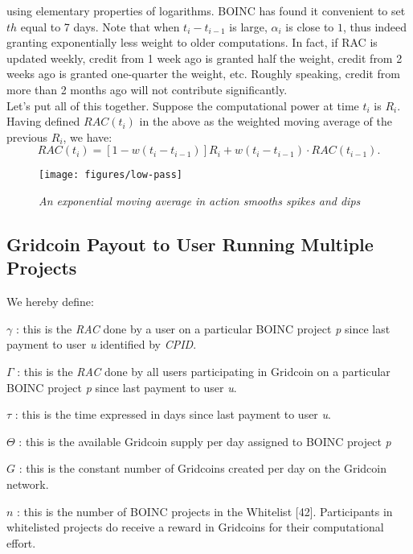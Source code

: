 using elementary properties of logarithms. BOINC has found it convenient to set $th$ equal to 7 days. Note that when $t_i - t_{i-1}$ is large, $\alpha_i$ is close to $1$, thus indeed granting exponentially less weight to older computations. In fact, if RAC is updated weekly, credit from 1 week ago is granted half the weight, credit from 2 weeks ago is granted one-quarter the weight, etc. Roughly speaking, credit from more than 2 months ago will not contribute significantly. \\
Let's put all of this together. Suppose the computational power at time $t_i$ is $R_i$. Having defined $RAC(t_i)$ in the above as the weighted moving average of the previous $R_i$, we have:
\begin{equation}
RAC(t_i) = \left[1 - w(t_i - t_{i-1})\right] R_i + w(t_i - t_{i-1}) \cdot RAC(t_{i-1}).
\end{equation}

\begin{figure}
\centering
\texttt{[image: figures/low-pass]}
\caption{\textit{An exponential moving average in action smooths spikes and dips}}
\small
\end{figure}

\subsection{Gridcoin Payout to User Running Multiple Projects}

We hereby define:
\begin{description}
  \item{$\gamma$} : this is the \textit{RAC} done by a user on a particular BOINC project \textit{p} since last payment to user \textit{u} identified by \textit{CPID}.
  \item{$\Gamma$} : this is the \textit{RAC} done by all users participating in Gridcoin on a particular BOINC project \textit{p} since last payment to user \textit{u}.
  \item{$\tau$} : this is the time expressed in days since last payment to user \textit{u}.
  \item{$\Theta$} : this is the available Gridcoin supply per day assigned to BOINC project \textit{p}
  \item{$G$} : this is the constant number of Gridcoins created per day on the Gridcoin network. 
  \item{$n$} : this is the number of BOINC projects in the Whitelist [42]. Participants in whitelisted projects do receive a reward in Gridcoins for their computational effort.  
\end{description}

